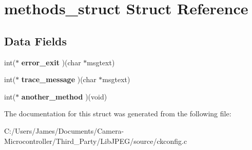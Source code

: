 \hypertarget{structmethods__struct}{}\section{methods\+\_\+struct Struct Reference}
\label{structmethods__struct}
\subsection*{Data Fields}
\begin{DoxyCompactItemize}
\item 
\mbox{\label{structmethods__struct_ac0d4ea412964e19aafa152b8fbb13f80}} 
int($\ast$ {\bfseries error\+\_\+exit} )(char $\ast$msgtext)
\item 
\mbox{\label{structmethods__struct_a81c7a194cf0018ba769fe77cf3e0f7fc}} 
int($\ast$ {\bfseries trace\+\_\+message} )(char $\ast$msgtext)
\item 
\mbox{\label{structmethods__struct_a6c337c80c4042260a79e7a956eff636b}} 
int($\ast$ {\bfseries another\+\_\+method} )(void)
\end{DoxyCompactItemize}


The documentation for this struct was generated from the following file\+:\begin{DoxyCompactItemize}
\item 
C\+:/\+Users/\+James/\+Documents/\+Camera-\/\+Microcontroller/\+Third\+\_\+\+Party/\+Lib\+J\+P\+E\+G/source/ckconfig.\+c\end{DoxyCompactItemize}
